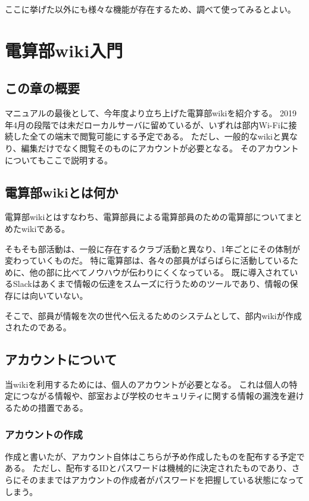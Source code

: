 \documentclass[lualatex,ja=standard,12pt,a4j]{bxjsbook}
\begin{document}
                
            	ここに挙げた以外にも様々な機能が存在するため、調べて使ってみるとよい。

	\chapter{電算部wiki入門}
    	\section{この章の概要}
        	マニュアルの最後として、今年度より立ち上げた電算部wikiを紹介する。
            2019年4月の段階では未だローカルサーバに留めているが、いずれは部内Wi-Fiに接続した全ての端末で閲覧可能にする予定である。
            ただし、一般的なwikiと異なり、編集だけでなく閲覧そのものにアカウントが必要となる。
            そのアカウントについてもここで説明する。
            
        \section{電算部wikiとは何か}
        	電算部wikiとはすなわち、電算部員による電算部員のための電算部についてまとめたwikiである。
            
            そもそも部活動は、一般に存在するクラブ活動と異なり、1年ごとにその体制が変わっていくものだ。
            特に電算部は、各々の部員がばらばらに活動しているために、他の部に比べてノウハウが伝わりにくくなっている。
            既に導入されているSlackはあくまで情報の伝達をスムーズに行うためのツールであり、情報の保存には向いていない。
            
            そこで、部員が情報を次の世代へ伝えるためのシステムとして、部内wikiが作成されたのである。
            
        \section{アカウントについて}
        	当wikiを利用するためには、個人のアカウントが必要となる。
            これは個人の特定につながる情報や、部室および学校のセキュリティに関する情報の漏洩を避けるための措置である。
            
            \subsection{アカウントの作成}
            	作成と書いたが、アカウント自体はこちらが予め作成したものを配布する予定である。
                ただし、配布するIDとパスワードは機械的に決定されたものであり、さらにそのままではアカウントの作成者がパスワードを把握している状態になってしまう。
                
\end{document}
